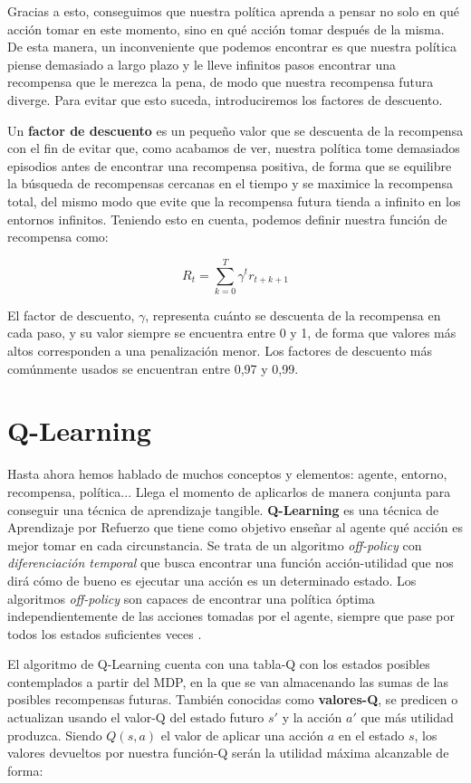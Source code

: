 Gracias a esto, conseguimos que nuestra política aprenda a pensar no solo en qué acción tomar en este momento, sino en qué acción tomar después de la misma. De esta manera, un inconveniente que podemos encontrar es que nuestra política piense demasiado a largo plazo y le lleve infinitos pasos encontrar una recompensa que le merezca la pena, de modo que nuestra recompensa futura diverge. Para evitar que esto suceda, introduciremos los factores de descuento.

Un \textbf{factor de descuento} es un pequeño valor que se descuenta de la recompensa con el fin de evitar que, como acabamos de ver, nuestra política tome demasiados episodios antes de encontrar una recompensa positiva, de forma que se equilibre la búsqueda de recompensas cercanas en el tiempo y se maximice la recompensa total, del mismo modo que evite que la recompensa futura tienda a infinito en los entornos infinitos. Teniendo esto en cuenta, podemos definir nuestra función de recompensa como:

$$R_{t} = \sum^{T}_{k = 0} \gamma^{t}r_{t + k + 1}$$

El factor de descuento, \( \gamma \), representa cuánto se descuenta de la recompensa en cada paso, y su valor siempre se encuentra entre 0 y 1, de forma que valores más altos corresponden a una penalización menor. Los factores de descuento más comúnmente usados se encuentran entre 0,97 y 0,99.


\section{Q-Learning}

Hasta ahora hemos hablado de muchos conceptos y elementos: agente, entorno, recompensa, política... Llega el momento de aplicarlos de manera conjunta para conseguir una técnica de aprendizaje tangible. \textbf{Q-Learning} es una técnica de Aprendizaje por Refuerzo que tiene como objetivo enseñar al agente qué acción es mejor tomar en cada circunstancia. Se trata de un algoritmo \textit{off-policy} con \textit{diferenciación temporal} que busca encontrar una función acción-utilidad que nos dirá cómo de bueno es ejecutar una acción es un determinado estado. Los algoritmos \textit{off-policy} son capaces de encontrar una política óptima independientemente de las acciones tomadas por el agente, siempre que pase por todos los estados suficientes veces \citep{PooleMackworth17}.

El algoritmo de Q-Learning cuenta con una tabla-Q con los estados posibles contemplados a partir del MDP, en la que se van almacenando las sumas de las posibles recompensas futuras. También conocidas como \textbf{valores-Q}, se predicen o actualizan usando el valor-Q del estado futuro $s'$ y la acción $a'$ que más utilidad produzca. Siendo $Q(s, a)$ el valor de aplicar una acción $a$ en el estado $s$, los valores devueltos por nuestra función-Q serán la utilidad máxima alcanzable de forma:

